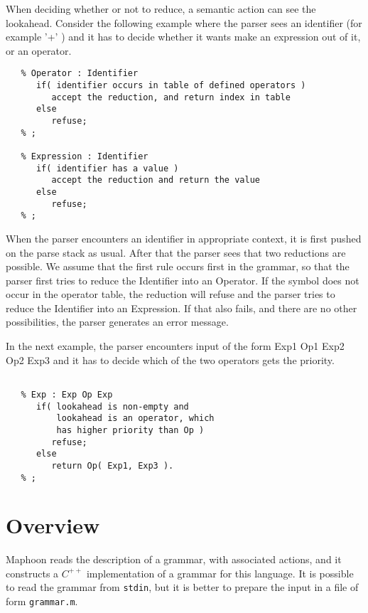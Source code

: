 \documentclass{article}
\begin{document}
\begin{enumerate}
   \noindent
   When deciding whether or not to reduce, a semantic action 
   can see the lookahead.
   Consider the following example where the parser sees an identifier 
   (for example
   '+' ) and it has to decide whether it wants make an expression out 
   of it, or an operator.
\begin{verbatim}
   % Operator : Identifier 
      if( identifier occurs in table of defined operators )
         accept the reduction, and return index in table
      else
         refuse;
   % ;

   % Expression : Identifier  
      if( identifier has a value )
         accept the reduction and return the value
      else
         refuse;
   % ;

\end{verbatim}
   When the parser encounters an identifier in appropriate context, 
   it is first pushed on the parse stack as usual. 
   After that the parser sees that two reductions are possible. 
   We assume that the first
   rule occurs first in the grammar, so that the parser first tries to 
   reduce the Identifier into an Operator.
   If the symbol does not occur in the operator table, the reduction 
   will refuse
   and the parser tries to reduce the Identifier into an Expression.
   If that also fails, and there are no other possibilities, the parser
   generates an error message. 

   \noindent
   In the next example, the parser encounters input of the form
   Exp1 Op1 Exp2 Op2 Exp3 and it has to decide which of the two
   operators gets the priority.
\begin{verbatim}

   % Exp : Exp Op Exp 
      if( lookahead is non-empty and
          lookahead is an operator, which 
          has higher priority than Op ) 
         refuse;
      else
         return Op( Exp1, Exp3 ).
   % ;

\end{verbatim}
   
\end{enumerate} 


\section{Overview}

Maphoon reads the description of a grammar, with associated
actions, and it constructs a $ C^{++} $ implementation of
a grammar for this language.
It is possible to read the grammar from \verb+stdin+, but
it is better to prepare the input in a file of form \verb+grammar.m+.
\end{document}
